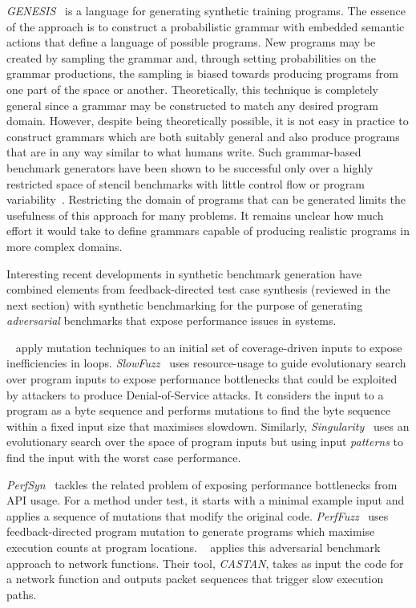 \emph{GENESIS}~\cite{Chiu2015} is a language for generating synthetic training programs. The essence of the approach is to construct a probabilistic grammar with embedded semantic actions that define a language of possible programs. New programs may be created by sampling the grammar and, through setting probabilities on the grammar productions, the sampling is biased towards producing programs from one part of the space or another. Theoretically, this technique is completely general since a grammar may be constructed to match any desired program domain. However, despite being theoretically possible, it is not easy in practice to construct grammars which are both suitably general and also produce programs that are in any way similar to what humans write. Such grammar-based benchmark generators have been shown to be successful only over a highly restricted space of stencil benchmarks with little control flow or program variability~\cite{Garvey2015b,Falch2015,Cummins2016a}. Restricting the domain of programs that can be generated limits the usefulness of this approach for many problems. It remains unclear how much effort it would take to define grammars capable of producing realistic programs in more complex domains.

Interesting recent developments in synthetic benchmark generation have combined elements from feedback-directed test case synthesis (reviewed in the next section) with synthetic benchmarking for the purpose of generating \emph{adversarial} benchmarks that expose performance issues in systems.

\citeauthor{Dhok2016}~\cite{Dhok2016} apply mutation techniques to an initial set of \linebreak coverage-driven inputs to expose inefficiencies in loops. \emph{SlowFuzz}~\cite{Petsios2017} uses \linebreak resource-usage to guide evolutionary search over program inputs to expose performance bottlenecks that could be exploited by attackers to produce Denial-of-Service attacks. It considers the input to a program as a byte sequence and performs mutations to find the byte sequence within a fixed input size that maximises slowdown. Similarly, \emph{Singularity}~\cite{Wei2018} uses an evolutionary search over the space of program inputs but using input \emph{patterns} to find the input with the worst case performance.

\emph{PerfSyn}~\cite{Toffola2018} tackles the related problem of exposing performance bottlenecks from API usage. For a method under test, it starts with a minimal example input and applies a sequence of mutations that modify the original code. \emph{PerfFuzz}~\cite{Lemieux2018} uses feedback-directed program mutation to generate programs which maximise execution counts at program locations. \citeauthor{Pedrosa2018}~\cite{Pedrosa2018} applies this adversarial benchmark approach to network functions. Their tool, \emph{CASTAN}, takes as input the code for a network function and outputs packet sequences that trigger slow execution paths.


